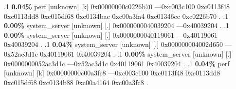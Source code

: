 \begin{profile}
{.1 \textbf{ 0.04\%} perf             [unknown]              [k] 0x00000000c0226b70\newline {} ---0xc003c100\newline {} 0xc0113f48\newline {} 0xc0113dd8\newline {} 0xc015df68\newline {} 0xc0134bac\newline {} 0xc00a3fa4\newline {} 0xc01346cc\newline {} 0xc0226b70\newline {} . 
.1 \textbf{ 0.00\%} system\_server    [unknown]              [.] 0x0000000040039204\newline {} ---0x40039204\newline {} . 
.1 \textbf{ 0.00\%} system\_server    [unknown]              [.] 0x0000000040119061\newline {} ---0x40119061\newline {} 0x40039204\newline {} . 
.1 \textbf{ 0.04\%} system\_server    [unknown]              [.] 0x000000004002d650\newline {} ---0x52ac3d1c\newline {} 0x40119061\newline {} 0x40039204\newline {} . 
.1 \textbf{ 0.00\%} system\_server    [unknown]              [.] 0x0000000052ac3d1c\newline {} ---0x52ac3d1c\newline {} 0x40119061\newline {} 0x40039204\newline {} . 
.1 \textbf{ 0.04\%} perf             [unknown]              [k] 0x00000000c00a3fc8\newline {} ---0xc003c100\newline {} 0xc0113f48\newline {} 0xc0113dd8\newline {} 0xc015df68\newline {} 0xc0134b88\newline {} 0xc00a4164\newline {} 0xc00a3fc8\newline {} . 
}
\end{profile}
